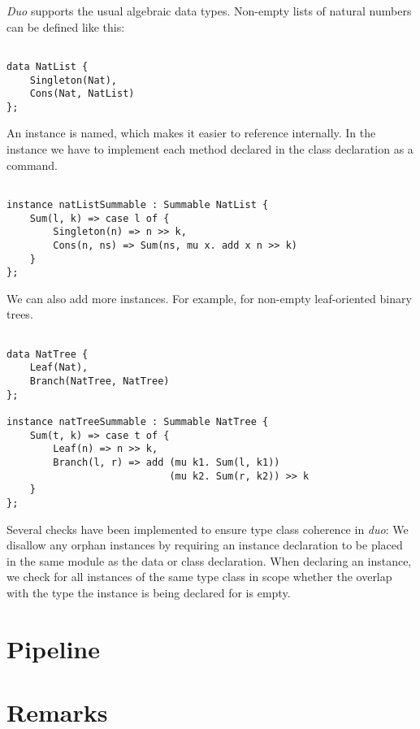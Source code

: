 \emph{Duo} supports the usual algebraic data types. Non-empty lists of natural numbers can be defined like this:

\begin{lstlisting}[style=duostyle, label=code:duo-nat-list, captionpos=b, caption={Data declaration for non-empty lists of natural numbers in \emph{duo}}]

data NatList {
    Singleton(Nat),
    Cons(Nat, NatList)
};

\end{lstlisting}

An instance is named, which makes it easier to reference internally.
In the instance we have to implement each method declared in the class declaration as a command.

\begin{lstlisting}[style=duostyle, label=code:duo-list-instance, captionpos=b, caption={Instance declaration for non-empty lists in \emph{duo}}]

instance natListSummable : Summable NatList {
    Sum(l, k) => case l of {
        Singleton(n) => n >> k,
        Cons(n, ns) => Sum(ns, mu x. add x n >> k)
    }
};

\end{lstlisting}

We can also add more instances. For example, for non-empty leaf-oriented binary trees.

\begin{lstlisting}[style=duostyle, label=code:duo-tree-instance, captionpos=b, caption={Type class example  in \emph{duo}}]

data NatTree {
    Leaf(Nat),
    Branch(NatTree, NatTree)
};

instance natTreeSummable : Summable NatTree {
    Sum(t, k) => case t of {
        Leaf(n) => n >> k,
        Branch(l, r) => add (mu k1. Sum(l, k1))
                            (mu k2. Sum(r, k2)) >> k
    }
};

\end{lstlisting}

Several checks have been implemented to ensure type class coherence in \emph{duo}:
We disallow any orphan instances by requiring an instance declaration to be placed in the same module as the data or class declaration.
When declaring an instance, we check for all instances of the same type class in scope whether the overlap with the type the instance is being declared for is empty.


\section{Pipeline}


\section{Remarks}

